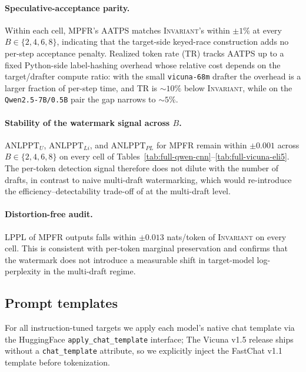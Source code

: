 \documentclass{article}
\theoremstyle{plain}
\theoremstyle{definition}
\begin{document}
\paragraph{Speculative-acceptance parity.}
Within each cell, \textsc{MPFR}'s AATPS matches \textsc{Invariant}'s
within $\pm 1\%$ at every $B \in \{2,4,6,8\}$, indicating that the
target-side keyed-race construction adds no per-step acceptance
penalty.  Realized token rate (TR) tracks AATPS up to a fixed
Python-side label-hashing overhead whose relative cost depends on the
target/drafter compute ratio: with the small \texttt{vicuna-68m}
drafter the overhead is a larger fraction of per-step time, and TR is
$\sim\!10\%$ below \textsc{Invariant}, while on the
\texttt{Qwen2.5-7B/0.5B} pair the gap narrows to $\sim\!5\%$.

\paragraph{Stability of the watermark signal across $B$.}
$\mathrm{ANLPPT}_U$, $\mathrm{ANLPPT}_{Li}$, and $\mathrm{ANLPPT}_{PL}$
for \textsc{MPFR} remain within $\pm 0.001$ across $B\in\{2,4,6,8\}$ on
every cell of Tables~\ref{tab:full-qwen-cnn}--\ref{tab:full-vicuna-eli5}.
The per-token detection signal therefore does not dilute with the
number of drafts, in contrast to naive multi-draft watermarking, which
would re-introduce the efficiency--detectability trade-off of
\citet{hu2024inevitable} at the multi-draft level.

\paragraph{Distortion-free audit.}
LPPL of \textsc{MPFR} outputs falls within $\pm 0.013$ nats/token of
\textsc{Invariant} on every cell.  This is consistent with per-token
marginal preservation and confirms that the watermark does not
introduce a measurable shift in target-model log-perplexity in the
multi-draft regime.

\subsection{Prompt templates}\label{app:prompts}
For all instruction-tuned targets we apply each model's native chat
template via the HuggingFace \texttt{apply\_chat\_template} interface;  The Vicuna v1.5 release ships without a
\texttt{chat\_template} attribute, so we explicitly inject the FastChat
v1.1 template before tokenization.
\end{document}
